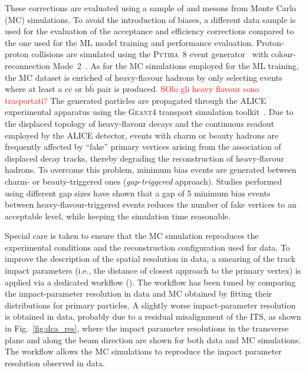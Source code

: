 These corrections are evaluated using a sample of \ds and \dpl mesons from Monte Carlo (MC) simulations. To avoid the introduction of biases, a different data sample is used for the evaluation of the acceptance and efficiency corrections compared to the one used for the ML model training and performance evaluation. Proton-proton collisions are simulated using the \textsc{Pythia~8} event generator~\cite{Bierlich:2022pfr} with colour-reconnection Mode~2~\cite{Christiansen:2015yqa}. As for the MC simulations employed for the ML training, the MC dataset is enriched of heavy-flavour hadrons by only selecting events where at least a $\mathrm{c\overline{c}}$ or $\mathrm{b\overline{b}}$ pair is produced. \textcolor{red}{SOlo gli heavy flavour sono trasportati?} The generated particles are propagated through the ALICE experimental apparatus using the \textsc{Geant4} transport simulation toolkit~\cite{GEANT4:2002zbu}. Due to the displaced topology of heavy-flavour decays and the continuous readout employed by the ALICE detector, events with charm or beauty hadrons are frequently affected by ``fake'' primary vertices arising from the association of displaced decay tracks, thereby degrading the reconstruction of heavy-flavour hadrons. To overcome this problem, minimum bias events are generated between charm- or beauty-triggered ones (\emph{gap-triggered} approach). Studies performed using different gap sizes have shown that a gap of 5 minimum bias events between heavy-flavour-triggered events reduces the number of fake vertices to an acceptable level, while keeping the simulation time reasonable.

Special care is taken to ensure that the MC simulation reproduces the experimental conditions and the reconstruction configuration used for data. To improve the description of the spatial resolution in data, a smearing of the track impact parameters (i.e., the distance of closest approach to the primary vertex) is applied via a dedicated workflow (). The workflow has been tuned by comparing the impact-parameter resolution in data and MC obtained by fitting their distributions for primary particles. A slightly worse impact-parameter resolution is obtained in data, probably due to a residual misalignment of the ITS, as shown in Fig.~\ref{fig:dca_res}, where the impact parameter resolutions in the transverse plane and along the beam direction are shown for both data and MC simulations. The  workflow allows the MC simulations to reproduce the impact parameter resolution observed in data.

